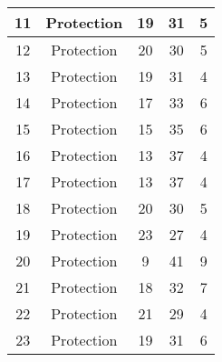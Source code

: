 \documentclass[results.tex]{subfiles}
\begin{document}
\begin{center}
\begin{tabular}{| c || c | c | c | c |}
            \hline
            11                      & Protection                   & 19                     & 31                      & 5                    \\
            \hline
            12                      & Protection                   & 20                     & 30                      & 5                    \\
            \hline
            13                      & Protection                   & 19                     & 31                      & 4                    \\
            \hline
            14                      & Protection                   & 17                     & 33                      & 6                    \\
            \hline
            15                      & Protection                   & 15                     & 35                      & 6                    \\
            \hline
            16                      & Protection                   & 13                     & 37                      & 4                    \\
            \hline
            17                      & Protection                   & 13                     & 37                      & 4                    \\
            \hline
            18                      & Protection                   & 20                     & 30                      & 5                    \\
            \hline
            19                      & Protection                   & 23                     & 27                      & 4                    \\
            \hline
            20                      & Protection                   & 9                      & 41                      & 9                    \\
            \hline
            21                      & Protection                   & 18                     & 32                      & 7                    \\
            \hline
            22                      & Protection                   & 21                     & 29                      & 4                    \\
            \hline
            23                      & Protection                   & 19                     & 31                      & 6                    \\

\end{tabular}
\end{center}
\end{document}
